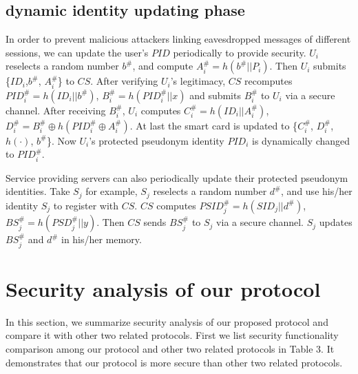 \documentclass[preprint,12pt]{elsarticle}
\begin{document}
\subsection{dynamic identity updating phase}
In order to prevent malicious attackers linking eavesdropped messages of different sessions, we can update the user's $PID$ periodically to provide security. $U_i$ reselects a random number $b^\#$, and compute $A^\#_i=h(b^\#||P_i)$. Then $U_i$ submits \{$ID_i$,$b^\#$, $A^\#_i$\} to $CS$. After verifying $U_i$'s legitimacy, $CS$ recomputes $PID^\#_i=h(ID_i||b^\#)$, $B^\#_i=h(PID^\#_i||x)$ and submits $B^\#_i$ to $U_i$ via a secure channel. After receiving $B^\#_i$, $U_i$ computes $C^\#_i=h(ID_i||A^\#_i)$, $D^\#_i=B^\#_i\oplus h(PID^\#_i\oplus A^\#_i)$. At last the smart card is updated to \{$C^\#_i$, $D^\#_i$,$h(\cdot)$, $b^\#$\}. Now $U_i$'s protected pseudonym identity $PID_i$ is dynamically changed to $PID^\#_i$.

Service providing servers can also periodically update their protected pseudonym identities. Take $S_j$ for example, $S_j$ reselects a random number $d^\#$, and use his/her identity $S_j$ to register with $CS$. $CS$ computes $PSID^\#_j=h(SID_j||d^\#)$, $BS^\#_j=h(PSD^\#_j||y)$. Then $CS$ sends $BS^\#_j$ to $S_j$ via a secure channel. $S_j$ updates $BS^\#_j$ and $d^\#$ in his/her memory.

\section{Security analysis of our protocol}
In this section, we summarize security analysis of our proposed protocol and compare it with other two related protocols. First we list security functionality comparison among our protocol and other two related protocols in Table 3. It demonstrates that our protocol is more secure than other two related protocols.
\end{document}
